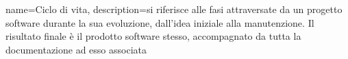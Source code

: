 {
	name={Ciclo di vita},
	description={si riferisce alle fasi attraversate da un progetto software durante la sua evoluzione, dall'idea iniziale alla manutenzione. Il risultato finale è il prodotto software stesso, accompagnato da tutta la documentazione ad esso associata}
}
